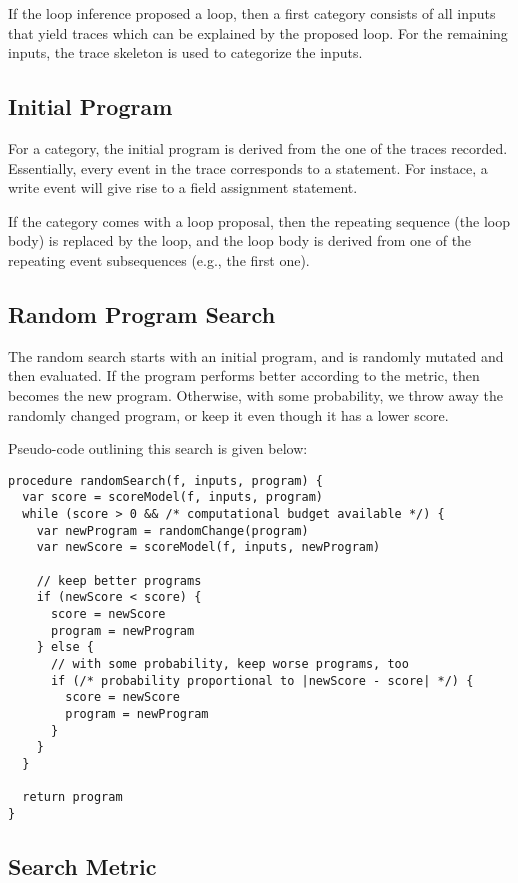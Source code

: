 \documentclass[]{article}
\begin{document}
If the loop inference proposed a loop, then a first category consists of
all inputs that yield traces which can be explained by the proposed loop.
For the remaining inputs, the trace skeleton is used to categorize
the inputs.

\subsection{Initial Program}

For a category, the initial program is derived from the one of the traces
recorded.
Essentially, every event in the trace corresponds to a statement.  For instace,
a write event will give rise to a field assignment statement.

If the category comes with a loop proposal, then the repeating sequence
(the loop body) is replaced by the loop, and the loop body is derived from
one of the repeating event subsequences (e.g., the first one).


\subsection{Random Program Search}

The random search starts with an initial program, and is randomly mutated
and then evaluated.  If the program performs better according to the
metric, then becomes the new program.  Otherwise, with some probability,
we throw away the randomly changed program, or keep it even though it
has a lower score.

Pseudo-code outlining this search is given below:

\begin{verbatim}
procedure randomSearch(f, inputs, program) {
  var score = scoreModel(f, inputs, program)
  while (score > 0 && /* computational budget available */) {
    var newProgram = randomChange(program)
    var newScore = scoreModel(f, inputs, newProgram)
    
    // keep better programs
    if (newScore < score) {
      score = newScore
      program = newProgram
    } else {
      // with some probability, keep worse programs, too
      if (/* probability proportional to |newScore - score| */) {
        score = newScore
        program = newProgram
      }
    }
  }
  
  return program
}
\end{verbatim}



\subsection{Search Metric}
\end{document}
